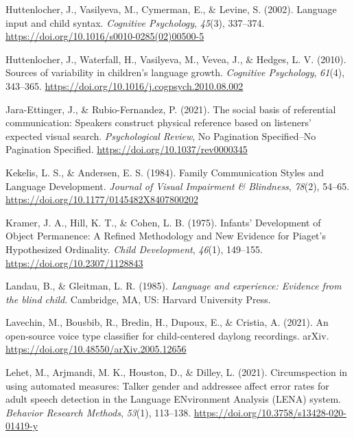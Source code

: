 \documentclass[
  man]{apa6}
\newlength{\cslhangindent}
\newlength{\cslentryspacingunit} %
\newenvironment{CSLReferences}[2] %
 {%
  \setlength{\parindent}{0pt}
  \ifodd #1
  \let\oldpar\par
  \def\par{\hangindent=\cslhangindent\oldpar}
  \fi
  \setlength{\parskip}{#2\cslentryspacingunit}
 }%
 {}
\begin{document}
\begin{CSLReferences}{1}{0}
\leavevmode{}%
Huttenlocher, J., Vasilyeva, M., Cymerman, E., \& Levine, S. (2002). Language input and child syntax. \emph{Cognitive Psychology}, \emph{45}(3), 337--374. \url{https://doi.org/10.1016/s0010-0285(02)00500-5}

\leavevmode{}%
Huttenlocher, J., Waterfall, H., Vasilyeva, M., Vevea, J., \& Hedges, L. V. (2010). Sources of variability in children's language growth. \emph{Cognitive Psychology}, \emph{61}(4), 343--365. \url{https://doi.org/10.1016/j.cogpsych.2010.08.002}

\leavevmode{}%
Jara-Ettinger, J., \& Rubio-Fernandez, P. (2021). The social basis of referential communication: {Speakers} construct physical reference based on listeners' expected visual search. \emph{Psychological Review}, No Pagination Specified--No Pagination Specified. \url{https://doi.org/10.1037/rev0000345}

\leavevmode{}%
Kekelis, L. S., \& Andersen, E. S. (1984). Family {Communication} {Styles} and {Language} {Development}. \emph{Journal of Visual Impairment \& Blindness}, \emph{78}(2), 54--65. \url{https://doi.org/10.1177/0145482X8407800202}

\leavevmode{}%
Kramer, J. A., Hill, K. T., \& Cohen, L. B. (1975). Infants' {Development} of {Object} {Permanence}: {A} {Refined} {Methodology} and {New} {Evidence} for {Piaget}'s {Hypothesized} {Ordinality}. \emph{Child Development}, \emph{46}(1), 149--155. \url{https://doi.org/10.2307/1128843}

\leavevmode{}%
Landau, B., \& Gleitman, L. R. (1985). \emph{Language and experience: {Evidence} from the blind child}. Cambridge, MA, US: Harvard University Press.

\leavevmode{}%
Lavechin, M., Bousbib, R., Bredin, H., Dupoux, E., \& Cristia, A. (2021). An open-source voice type classifier for child-centered daylong recordings. arXiv. \url{https://doi.org/10.48550/arXiv.2005.12656}

\leavevmode{}%
Lehet, M., Arjmandi, M. K., Houston, D., \& Dilley, L. (2021). Circumspection in using automated measures: {Talker} gender and addressee affect error rates for adult speech detection in the {Language} {ENvironment} {Analysis} ({LENA}) system. \emph{Behavior Research Methods}, \emph{53}(1), 113--138. \url{https://doi.org/10.3758/s13428-020-01419-y}


\end{CSLReferences}
\end{document}
